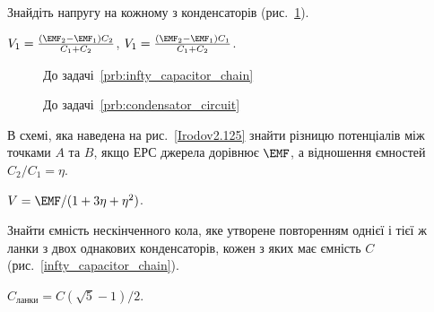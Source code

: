 \begin{problem}\label{prb:condensator_circuit}
    Знайдіть напругу на кожному з конденсаторів (рис.~\ref{condensator_circuit}).
\begin{solution}
	$V_1 = \frac{(\EMF_2 - \EMF_1) C_2}{C_1 + C_2}$, $V_1 = \frac{(\EMF_2 - \EMF_1) C_1}{C_1 + C_2}$.
\end{solution}
\end{problem}
\begin{figure}[h!]\centering
\begin{minipage}[t]{0.45\linewidth}\centering
{}
\caption{До задачі~\ref{prb:infty_capacitor_chain}}
\label{section_of_circuin_with_condensators}
\end{minipage}
\begin{minipage}[t]{0.45\linewidth}\centering
\caption{До задачі~\ref{prb:condensator_circuit}}
\label{condensator_circuit}
\end{minipage}
\end{figure}
\begin{problem}\label{prb:Irodov2.125}
В схемі, яка наведена на рис.~\ref{Irodov2.125} знайти різницю потенціалів між точками $A$ та $B$, якщо ЕРС джерела дорівнює $\EMF$, а відношення ємностей $C_2/C_1 = \eta$.  
\begin{solution}
	$V = \EMF/ (1 + 3\eta + \eta^2)$.
\end{solution}
\end{problem}

\begin{problem}\label{prb:infty_capacitor_chain}
Знайти ємність нескінченного кола, яке утворене повторенням однієї і тієї ж ланки з двох однакових конденсаторів, кожен з яких має ємність $C$ (рис.~\ref{infty_capacitor_chain}).
\begin{solution}
	$C_\text{ланки} = C \left( \sqrt5 -1 \right)/2$.
\end{solution}
\end{problem}

